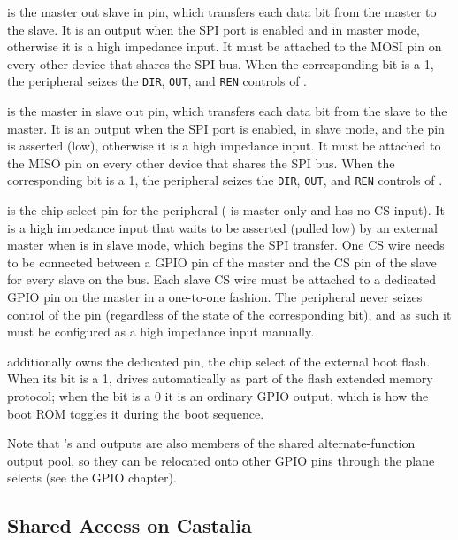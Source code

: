  is the master out slave in pin, which transfers each data bit from the master to the slave. It is an output when the SPI port is enabled and in master mode, otherwise it is a high impedance input. It must be attached to the MOSI pin on every other device that shares the SPI bus. When the corresponding  bit is a 1, the  peripheral seizes the \texttt{DIR}, \texttt{OUT}, and \texttt{REN} controls of .

 is the master in slave out pin, which transfers each data bit from the slave to the master. It is an output when the SPI port is enabled, in slave mode, and the  pin is asserted (low), otherwise it is a high impedance input. It must be attached to the MISO pin on every other device that shares the SPI bus. When the corresponding  bit is a 1, the  peripheral seizes the \texttt{DIR}, \texttt{OUT}, and \texttt{REN} controls of .

 is the chip select pin for the  peripheral ( is master-only and has no CS input). It is a high impedance input that waits to be asserted (pulled low) by an external master when  is in slave mode, which begins the SPI transfer. One CS wire needs to be connected between a GPIO pin of the master and the CS pin of the slave for every slave on the bus. Each slave CS wire must be attached to a dedicated GPIO pin on the master in a one-to-one fashion. The  peripheral never seizes control of the  pin (regardless of the state of the corresponding  bit), and as such it must be configured as a high impedance input manually.

 additionally owns the dedicated  pin, the chip select of the external boot flash. When its  bit is a 1,  drives  automatically as part of the flash extended memory protocol; when the bit is a 0 it is an ordinary GPIO output, which is how the boot ROM toggles it during the boot sequence.

Note that 's  and  outputs are also members of the shared alternate-function output pool, so they can be relocated onto other GPIO pins through the  plane selects (see the GPIO chapter).


\subsection{Shared Access on Castalia}

